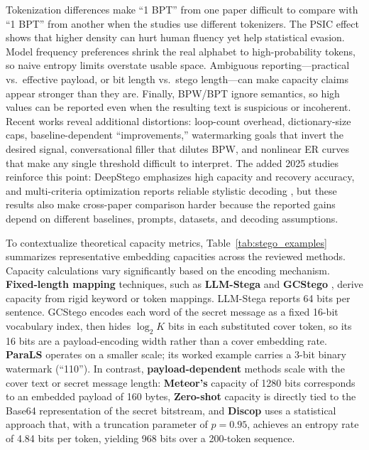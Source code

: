 Tokenization differences make ``1 BPT'' from one paper difficult to compare with ``1 BPT'' from another when the studies use different tokenizers. The PSIC effect shows that higher density can hurt human fluency yet help statistical evasion. Model frequency preferences shrink the real alphabet to high-probability tokens, so naive entropy limits overstate usable space. Ambiguous reporting---practical vs.\ effective payload, or bit length vs.\ stego length---can make capacity claims appear stronger than they are. Finally, BPW/BPT ignore semantics, so high values can be reported even when the resulting text is suspicious or incoherent. Recent works reveal additional distortions: loop-count overhead, dictionary-size caps, baseline-dependent ``improvements,'' watermarking goals that invert the desired signal, conversational filler that dilutes BPW, and nonlinear ER curves that make any single threshold difficult to interpret. The added 2025 studies reinforce this point: DeepStego emphasizes high capacity and recovery accuracy, and multi-criteria optimization reports reliable stylistic decoding \cite{kuznetsov2025deepstego,wozniak2025multicriteria}, but these results also make cross-paper comparison harder because the reported gains depend on different baselines, prompts, datasets, and decoding assumptions.

To contextualize theoretical capacity metrics, Table~\ref{tab:stego_examples} summarizes representative embedding capacities across the reviewed methods. Capacity calculations vary significantly based on the encoding mechanism. \textbf{Fixed-length mapping} techniques, such as \textbf{LLM-Stega} \cite{wu2024generative} and \textbf{GCStego} \cite{li2024imperceptible}, derive capacity from rigid keyword or token mappings. LLM-Stega reports 64 bits per sentence. GCStego encodes each word of the secret message as a fixed 16-bit vocabulary index, then hides $\log_2 K$ bits in each substituted cover token, so its 16 bits are a payload-encoding width rather than a cover embedding rate. \textbf{ParaLS} \cite{qiang2023natural} operates on a smaller scale; its worked example carries a 3-bit binary watermark (``110''). In contrast, \textbf{payload-dependent} methods scale with the cover text or secret message length: \textbf{Meteor's} capacity of 1280 bits corresponds to an embedded payload of 160 bytes, \textbf{Zero-shot} capacity is directly tied to the Base64 representation of the secret bitstream, and \textbf{Discop} uses a statistical approach that, with a truncation parameter of $p=0.95$, achieves an entropy rate of 4.84 bits per token, yielding 968 bits over a 200-token sequence.

